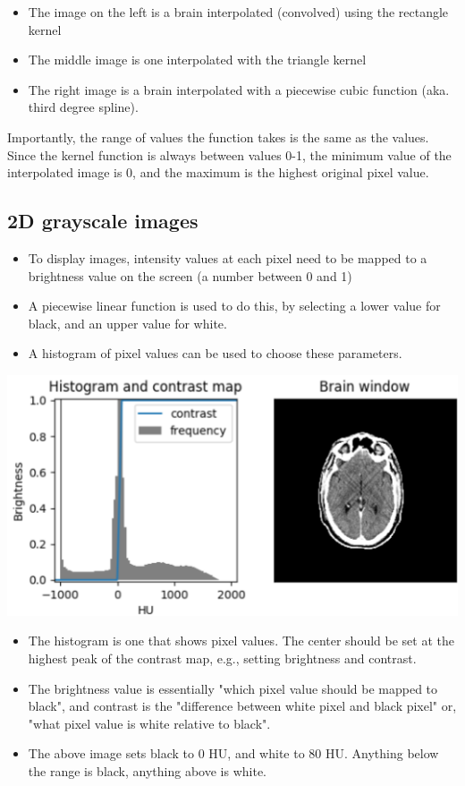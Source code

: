 \documentclass[10pt]{article}
\begin{document}
\begin{itemize}
    \item The image on the left is a brain interpolated (convolved) using the rectangle kernel
    \item The middle image is one interpolated with the triangle kernel
    \item The right image is a brain interpolated with a piecewise cubic function (aka. third degree spline).
\end{itemize}
Importantly, the range of values the function takes is the same as the values.  Since the kernel function is always between values 0-1, the minimum value of the interpolated image is 0, and the maximum is the highest original pixel value.

\subsection*{2D grayscale images}
\begin{itemize}
    \item To display images, intensity values at each pixel need to be mapped to a brightness value on the screen (a number between 0 and 1)
    \item A piecewise linear function is used to do this, by selecting a lower value for black, and an upper value for white.
    \item A histogram of pixel values can be used to choose these parameters.
\end{itemize}
\begin{center}
    \includegraphics*[scale=1]{W1_8.png}
\end{center}
\begin{itemize}
    \item The histogram is one that shows pixel values.  The center should be set at the highest peak of the contrast map, e.g., setting brightness and contrast.
    \item The brightness value is essentially "which pixel value should be mapped to black", and contrast is the "difference between white pixel and black pixel" or, "what pixel value is white relative to black".
    \item The above image sets black to 0 HU, and white to 80 HU.  Anything below the range is black, anything above is white.
\end{itemize}
\end{document}
